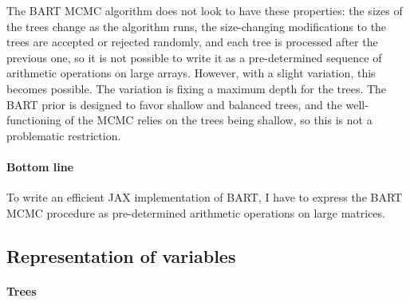 \documentclass{article}
\begin{document}
    The BART MCMC algorithm does not look to have these properties: the sizes of the trees change as the algorithm runs, the size-changing modifications to the trees are accepted or rejected randomly, and each tree is processed after the previous one, so it is not possible to write it as a pre-determined sequence of arithmetic operations on large arrays. However, with a slight variation, this becomes possible. The variation is fixing a maximum depth for the trees. The BART prior is designed to favor shallow and balanced trees, and the well-functioning of the MCMC relies on the trees being shallow, so this is not a problematic restriction.

    \paragraph{Bottom line}

    To write an efficient JAX implementation of BART, I have to express the BART MCMC procedure as pre-determined arithmetic operations on large matrices.

    \subsection{Representation of variables}

    \paragraph{Trees}
\end{document}
